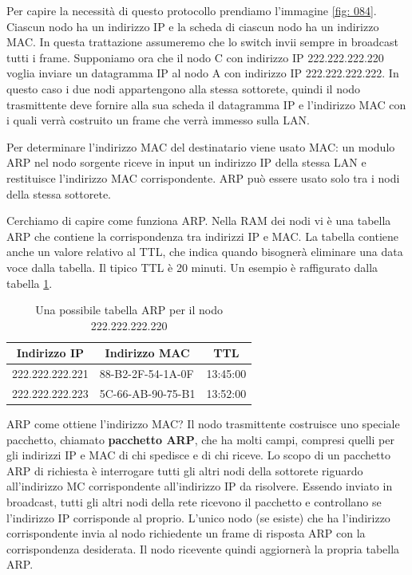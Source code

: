 \documentclass[11pt,a4paper]{article}
\begin{document}
{Per capire la necessità di questo protocollo prendiamo l'immagine \ref{fig: 084}. Ciascun nodo ha un indirizzo IP e la scheda di ciascun nodo ha un indirizzo MAC. In questa trattazione assumeremo che lo switch invii sempre in broadcast tutti i frame. Supponiamo ora che il nodo C con indirizzo IP 222.222.222.220 voglia inviare un datagramma IP al nodo A con indirizzo IP 222.222.222.222. In questo caso i due nodi appartengono alla stessa sottorete, quindi il nodo trasmittente deve fornire alla sua scheda il datagramma IP e l'indirizzo MAC con i quali verrà costruito un frame che verrà immesso sulla LAN.

Per determinare l'indirizzo MAC del destinatario viene usato MAC: un modulo ARP nel nodo sorgente riceve in input un indirizzo IP della stessa LAN e restituisce l'indirizzo MAC corrispondente. ARP può essere usato solo tra i nodi della stessa sottorete.

Cerchiamo di capire come funziona ARP. Nella RAM dei nodi vi è una tabella ARP che contiene la corrispondenza tra indirizzi IP e MAC. La tabella contiene anche un valore relativo al TTL, che indica quando bisognerà eliminare una data voce dalla tabella. Il tipico TTL è 20 minuti. Un esempio è raffigurato dalla tabella \ref{tab: 002}.
\begin{table}[]
	\begin{tabular}{|l|l|l|}
		\hline
		\multicolumn{1}{|c|}{\textbf{Indirizzo IP}} & \multicolumn{1}{c|}{\textbf{Indirizzo MAC}} & \multicolumn{1}{c|}{\textbf{TTL}} \\ \hline
		222.222.222.221                             & 88-B2-2F-54-1A-0F                           & 13:45:00                          \\ \hline
		222.222.222.223                             & 5C-66-AB-90-75-B1                           & 13:52:00                          \\ \hline
	\end{tabular}
	\caption{Una possibile tabella ARP per il nodo 222.222.222.220}
	\label{tab: 002}
\end{table}

ARP come ottiene l'indirizzo MAC? Il nodo trasmittente costruisce uno speciale pacchetto, chiamato \textbf{pacchetto ARP}, che ha molti campi, compresi quelli per gli indirizzi IP e MAC di chi spedisce e di chi riceve. Lo scopo di un pacchetto ARP di richiesta è interrogare tutti gli altri nodi della sottorete riguardo all'indirizzo MC corrispondente all'indirizzo IP da risolvere. Essendo inviato in broadcast, tutti gli altri nodi della rete ricevono il pacchetto e controllano se l'indirizzo IP corrisponde al proprio. L'unico nodo (se esiste) che ha l'indirizzo corrispondente invia al nodo richiedente un frame di risposta ARP con la corrispondenza desiderata. Il nodo ricevente quindi aggiornerà la propria tabella ARP.

}
\end{document}
